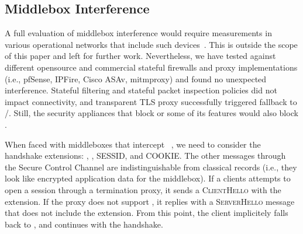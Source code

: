 

\subsection{Middlebox Interference}
\label{sec:middlebox}

A full evaluation of middlebox interference would require measurements in various operational networks that include such devices~\cite{honda2011still,raman2020measuring,o2016tls}. This is
outside the scope of this paper and left for further work. Nevertheless, we have tested \tcpls against different opensource and commercial stateful
firewalls and proxy implementations (i.e., pfSense, IPFire, Cisco ASAv,
mitmproxy) and found no unexpected interference. Stateful filtering and stateful
packet inspection policies did not impact connectivity, and transparent TLS proxy successfully triggered \tcpls fallback to \tls/\tcp. Still, the security
appliances that block  or some of its features
\cite{lee2019matls,Bock_China,raman2020measuring} would also block \tcpls.

When faced with middleboxes that intercept ~\cite{Bock_China,raman2020measuring}, we need to consider the \tcpls handshake \tls extensions: \tcpls, \join, SESSID, and COOKIE. The other
\tcpls messages through the Secure Control Channel are indistinguishable from
classical \tls records (i.e., they look like encrypted application data
for the middlebox). If a clients attempts to open a \tcpls session
through a \tls termination proxy, it sends a \textsc{ClientHello} with the
\tcpls extension. If the proxy does not support \tcpls, it replies with a
\textsc{ServerHello} message that does not include the \tcpls extension. From
this point, the client implicitely falls back to \tls, and continues with the
handshake.

